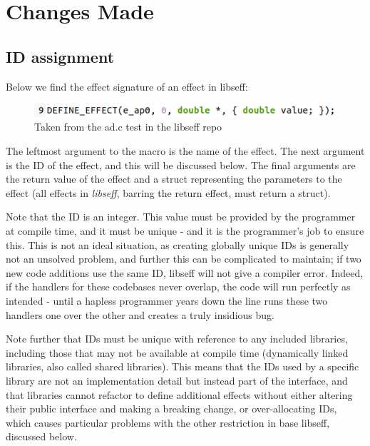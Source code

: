 \documentclass[logo,bsc,singlespacing,parskip,online]{infthesis}
\begin{document}
\chapter{Changes Made} \label{method}

\section{ID assignment}

Below we find the effect signature of an effect in libseff:

\begin{figure}[h]
    \centering
    \includegraphics[width=0.9\linewidth]{eff_def.png}
    \caption{Taken from the ad.c test in the libseff repo}
\end{figure}

The leftmost argument to the macro is the name of the effect. The next argument is the ID of the effect, and this will be discussed below. The final arguments are the return value of the effect and a struct representing the parameters to the effect (all effects in \textit{libseff}, barring the return effect, must return a struct).

Note that the ID is an integer. This value must be provided by the programmer at compile time, and it must be unique - and it is the programmer's job to ensure this. This is not an ideal situation, as creating globally unique IDs is generally not an unsolved problem, and further this can be complicated to maintain; if two new code additions use the same ID, libseff will not give a compiler error. Indeed, if the handlers for these codebases never overlap, the code will run perfectly as intended - until a hapless programmer years down the line runs these two handlers one over the other and creates a truly insidious bug.

Note further that IDs must be unique with reference to any included libraries, including those that may not be available at compile time (dynamically linked libraries, also called shared libraries). This means that the IDs used by a specific library are not an implementation detail but instead part of the interface, and that libraries cannot refactor to define additional effects without either altering their public interface and making a breaking change, or over-allocating IDs, which causes particular problems with the other restriction in base libseff, discussed below.
\end{document}
